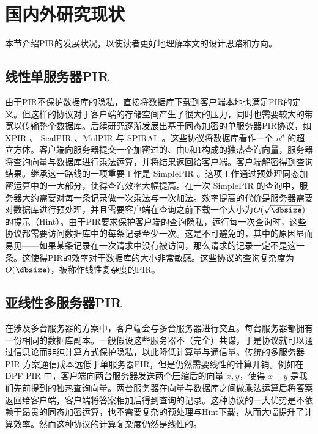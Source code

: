 \section{国内外研究现状}

本节介绍PIR的发展状况，以使读者更好地理解本文的设计思路和方向。

\subsection{线性单服务器PIR}
由于PIR不保护数据库的隐私，直接将数据库下载到客户端本地也满足PIR的定义。但这样的协议对于客户端的存储空间产生了很大的压力，同时也需要较大的带宽以传输整个数据库。后续研究逐渐发展出基于同态加密的单服务器PIR协议，如XPIR \cite{EPRINT:ABFK14}、 SealPIR \cite{SP:ACLS18}、MulPIR \cite{USENIX:ALPRSSY21} 与 SPIRAL \cite{SP:MenWu22}。这些协议将数据库看作一个 $n^d$ 的超立方体。客户端向服务器提交一个加密过的、由$0$和$1$构成的独热查询向量，服务器将查询向量与数据库进行乘法运算，并将结果返回给客户端。客户端解密得到查询结果。继承这一路线的一项重要工作是 SimplePIR \cite{SimplePIR}。这项工作通过预处理同态加密运算中的一大部分，使得查询效率大幅提高。在一次 SimplePIR 的查询中，服务器大约需要对每一条记录做一次乘法与一次加法。效率提高的代价是服务器需要对数据库进行预处理，并且需要客户端在查询之前下载一个大小为$O(\sqrt{\dbsize})$的提示（Hint）。由于PIR要求保护客户端的查询隐私，运行每一次查询时，这些协议都需要访问数据库中的每条记录至少一次。这是不可避免的，其中的原因显而易见——如果某条记录在一次请求中没有被访问，那么请求的记录一定不是这一条。这使得PIR的效率对于数据库的大小非常敏感。这些协议的查询复杂度为 $O(\dbsize)$，被称作线性复杂度的PIR。

\subsection{亚线性多服务器PIR}

在涉及多台服务器的方案中，客户端会与多台服务器进行交互。每台服务器都拥有一份相同的数据库副本。一般假设这些服务器不（完全）共谋，于是协议就可以通过信息论而非纯计算方式保护隐私，以此降低计算量与通信量。传统的多服务器 PIR 方案通信成本远低于单服务器PIR，但是仍然需要线性的计算开销。例如在 DPF-PIR \cite{DPF-PIR}中，客户端向两台服务器发送两个压缩后的向量 $x,y$，使得 $x + y$ 是我们先前提到的独热查询向量。两台服务器在向量与数据库之间做乘法运算后将答案返回给客户端，客户端将答案相加后得到查询的记录。这种协议的一大优势是不依赖于昂贵的同态加密运算，也不需要复杂的预处理与Hint下载，从而大幅提升了计算效率。然而这种协议的计算复杂度仍然是线性的。

